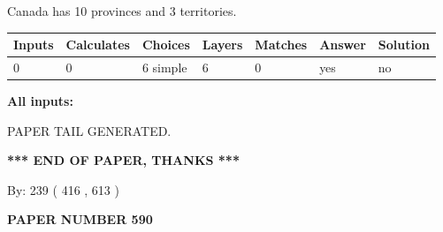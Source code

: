 \documentclass[12pt]{article}
\begin{document}
 
\noindent{}
 
 
Canada has 10  provinces and 3 territories.
 
 
\noindent{}
 
 
   
   
   
   
\noindent\begin{tabular}{|l|l|l|l|l|l|l|}
 \hline
Inputs & Calculates & Choices & Layers & Matches & Answer & Solution \\ \hline
 0  & 
 0  & 
 6
  simple  
  & 
 6  & 
 0  & 
  yes & 
  no 
  \\ \hline
 \end{tabular}
   
   
   
   
\noindent{}
   
   
   
   
\noindent\vspace{0.1in}\hspace{-0.08in} {\textbf{\Large{All inputs: }}}
   
   
   
   
   
   
 \vspace{0.2in}
 
   
   
\vspace{2.0in} PAPER TAIL GENERATED.
   
   
   
   
\vspace{1.0in} 
{\textbf{\large{ *** END OF PAPER, THANKS *** }}} 
   
   
\hspace{1.0in} By: 
 239 ( 416 ,  613 )
   
   
   
   
\newpage 
\setcounter{page}{ 
   590001 } 
   
   
   
   
 {\textbf{ \Large{ PAPER NUMBER  590  }}}
   
   
\vspace{0.2in}
   
   
   
\end{document}
